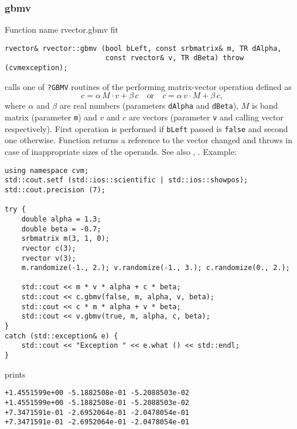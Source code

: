\subsubsection{gbmv}
Function%
\pdfdest name {rvector.gbmv} fit
\begin{verbatim}
rvector& rvector::gbmv (bool bLeft, const srbmatrix& m, TR dAlpha,
                        const rvector& v, TR dBeta) throw (cvmexception);
\end{verbatim}
calls one of \verb"?GBMV" routines of the
performing matrix-vector operation defined as
\begin{equation*}
c=\alpha\,M\cdot v + \beta\,c\quad\text{or}\quad c=\alpha\,v\cdot M + \beta\, c,
\end{equation*}
where $\alpha$ and $\beta$ are real numbers 
(parameters \verb"dAlpha" and \verb"dBeta"),
$M$ is  band matrix (parameter \verb"m")
and $v$ and $c$ are vectors (parameter \verb"v"
and calling vector respectively).
First operation is performed if \verb"bLeft" passed
is \verb"false" and second one otherwise.
Function
returns a reference to the vector changed and throws
in case of inappropriate sizes of the operands.
See also
,
.
Example:
\begin{Verbatim}
using namespace cvm;
std::cout.setf (std::ios::scientific | std::ios::showpos);
std::cout.precision (7);

try {
    double alpha = 1.3;
    double beta = -0.7;
    srbmatrix m(3, 1, 0);
    rvector c(3);
    rvector v(3);
    m.randomize(-1., 2.); v.randomize(-1., 3.); c.randomize(0., 2.);

    std::cout << m * v * alpha + c * beta;
    std::cout << c.gbmv(false, m, alpha, v, beta);
    std::cout << c * m * alpha + v * beta;
    std::cout << v.gbmv(true, m, alpha, c, beta);
}
catch (std::exception& e) {
    std::cout << "Exception " << e.what () << std::endl;
}
\end{Verbatim}
prints
\begin{Verbatim}
+1.4551599e+00 -5.1882508e-01 -5.2088503e-02
+1.4551599e+00 -5.1882508e-01 -5.2088503e-02
+7.3471591e-01 -2.6952064e-01 -2.0478054e-01
+7.3471591e-01 -2.6952064e-01 -2.0478054e-01
\end{Verbatim}
\newpage




